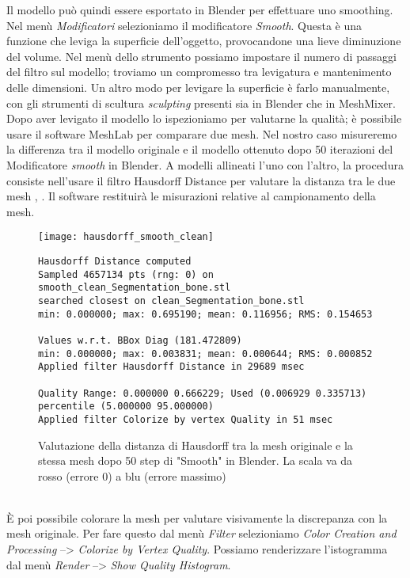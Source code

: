 Il modello può quindi essere esportato in Blender per effettuare uno smoothing. Nel menù \emph{Modificatori}  selezioniamo il modificatore \emph{Smooth}. Questa è una funzione che leviga la superficie dell'oggetto, provocandone una lieve diminuzione del volume. Nel menù dello strumento possiamo impostare il numero di passaggi del filtro sul modello; troviamo un compromesso tra levigatura e mantenimento delle dimensioni. Un altro modo per levigare la superficie è farlo manualmente, con gli strumenti di scultura \emph{sculpting} presenti sia in Blender che in MeshMixer.\\
Dopo aver levigato il modello lo ispezioniamo per valutarne la qualità; è possibile usare il software MeshLab per comparare due mesh. Nel nostro caso misureremo la differenza tra il modello originale e il modello ottenuto dopo 50 iterazioni del Modificatore \emph{smooth} in Blender. A modelli allineati l'uno con l'altro, la procedura consiste nell'usare il filtro Hausdorff Distance per valutare la distanza tra le due mesh \parencite{Reference90}, \parencite{Reference91}. Il software restituirà le misurazioni relative al campionamento della mesh.\\
\vspace{3cm}
\begin{figure}[h]
\centering
\texttt{[image: hausdorff\_smooth\_clean]}
\caption[LoF entry]{Valutazione della distanza di Hausdorff tra la mesh originale e la stessa mesh dopo 50 step di "Smooth" in Blender. La scala va da rosso (errore 0) a blu (errore massimo)}
\begin{lstlisting}
Hausdorff Distance computed
Sampled 4657134 pts (rng: 0) on smooth_clean_Segmentation_bone.stl
searched closest on clean_Segmentation_bone.stl
min: 0.000000; max: 0.695190; mean: 0.116956; RMS: 0.154653

Values w.r.t. BBox Diag (181.472809)
min: 0.000000; max: 0.003831; mean: 0.000644; RMS: 0.000852 
Applied filter Hausdorff Distance in 29689 msec

Quality Range: 0.000000 0.666229; Used (0.006929 0.335713)
percentile (5.000000 95.000000) 
Applied filter Colorize by vertex Quality in 51 msec
\end{lstlisting}

\label{fig:hausdorff_smooth_clean}
\end{figure}
\\
È poi possibile colorare la mesh per valutare visivamente la discrepanza con la mesh originale. Per fare questo dal menù \emph{Filter} selezioniamo \emph{Color Creation and Processing} --> \emph{Colorize by Vertex Quality}. Possiamo renderizzare l'istogramma dal menù \emph{Render} --> \emph{Show Quality Histogram}.\\
